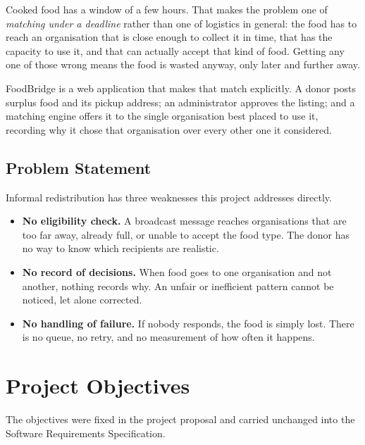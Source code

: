 \documentclass[11pt,a4paper]{report}
\begin{document}
Cooked food has a window of a few hours. That makes the problem one of
\emph{matching under a deadline} rather than one of logistics in general: the
food has to reach an organisation that is close enough to collect it in time,
that has the capacity to use it, and that can actually accept that kind of food.
Getting any one of those wrong means the food is wasted anyway, only later and
further away.

FoodBridge is a web application that makes that match explicitly. A donor posts
surplus food and its pickup address; an administrator approves the listing; and
a matching engine offers it to the single organisation best placed to use it,
recording why it chose that organisation over every other one it considered.

\subsection{Problem Statement}

Informal redistribution has three weaknesses this project addresses directly.

\begin{itemize}
  \item \textbf{No eligibility check.} A broadcast message reaches organisations
    that are too far away, already full, or unable to accept the food type. The
    donor has no way to know which recipients are realistic.
  \item \textbf{No record of decisions.} When food goes to one organisation and
    not another, nothing records why. An unfair or inefficient pattern cannot be
    noticed, let alone corrected.
  \item \textbf{No handling of failure.} If nobody responds, the food is simply
    lost. There is no queue, no retry, and no measurement of how often it happens.
\end{itemize}

\section{Project Objectives}

The objectives were fixed in the project proposal and carried unchanged into
the Software Requirements Specification.
\end{document}

